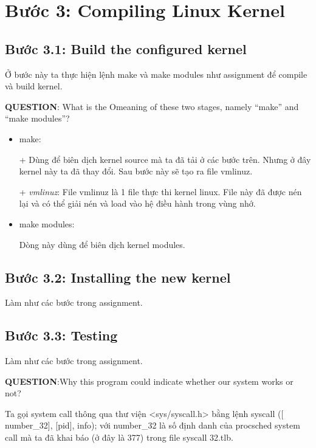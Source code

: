 \section{Bước 3: Compiling Linux Kernel}

\subsection{Bước 3.1: Build the configured kernel}

Ở bước này ta thực hiện lệnh make và make modules như assignment để compile và build kernel.

\vspace{0.2cm}

\textbf{QUESTION}: What is the Omeaning of these two stages, namely “make” and “make modules”?

\begin{itemize}
	\item make:
	
	+ Dùng để biên dịch kernel source mà ta đã tải ở các bước trên. Nhưng ở đây kernel này ta đã thay đổi. Sau bước này sẽ tạo ra file vmlinuz.
	
	+ \textit{vmlinuz}: File vmlinuz là 1 file thực thi kernel linux. File này đã được nén lại và có thể giải nén và load vào hệ điều hành trong vùng nhớ.
	
	\item make modules:
	
	Dòng này dùng để biên dịch kernel modules.
\end{itemize}


\subsection{Bước 3.2: Installing the new kernel}

Làm như các bước trong assignment.

\subsection{Bước 3.3: Testing}

Làm như các bước trong assignment.

\vspace{0.2cm}

\textbf{QUESTION}:Why this program could indicate whether our system works or not?

\vspace{0.2cm}

Ta gọi system call thông qua thư viện <sys/syscall.h> bằng lệnh syscall ([ number\_32], [pid], info);  với  number\_32  là số định danh của  procsched system call mà ta đã khai báo (ở đây là 377) trong file  syscall 32.tlb.

